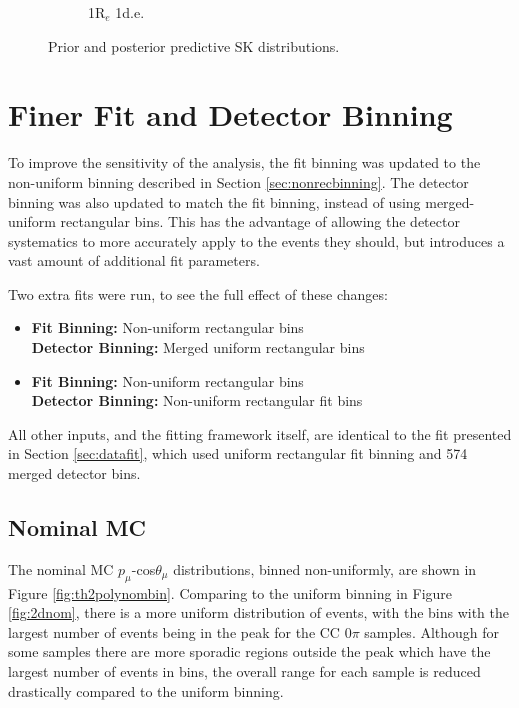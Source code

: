 \begin{figure}
\begin{subfigure}{.49\textwidth}
   \caption{1R$_{e}$ 1d.e.}
  \label{fig:skppnue1pi}
\end{subfigure}
\caption{Prior and posterior predictive SK distributions.}
\label{fig:skpp}
\end{figure}

\section{Finer Fit and Detector Binning}\label{sec:newbin}

To improve the sensitivity of the analysis, the fit binning was updated to the non-uniform binning described in Section \ref{sec:nonrecbinning}. The detector binning was also updated to match the fit binning, instead of using merged-uniform rectangular bins. This has the advantage of allowing the detector systematics to more accurately apply to the events they should, but introduces a vast amount of additional fit parameters.

Two extra fits were run, to see the full effect of these changes:

\begin{itemize}

\item \textbf{Fit Binning: } Non-uniform rectangular bins\\
\textbf{Detector Binning: } Merged uniform rectangular bins

\item \textbf{Fit Binning: } Non-uniform rectangular bins\\
\textbf{Detector Binning: } Non-uniform rectangular fit bins

\end{itemize}

All other inputs, and the fitting framework itself, are identical to the fit presented in Section \ref{sec:datafit}, which used uniform rectangular fit binning and 574 merged detector bins.

\subsection{Nominal MC}

The nominal MC $p_{\mu}$-cos$\theta_{\mu}$ distributions, binned non-uniformly, are shown in Figure \ref{fig:th2polynombin}. Comparing to the uniform binning in Figure \ref{fig:2dnom}, there is a more uniform distribution of events, with the bins with the largest number of events being in the peak for the CC $0\pi$ samples. Although for some samples there are more sporadic regions outside the peak which have the largest number of events in bins, the overall range for each sample is reduced drastically compared to the uniform binning.

